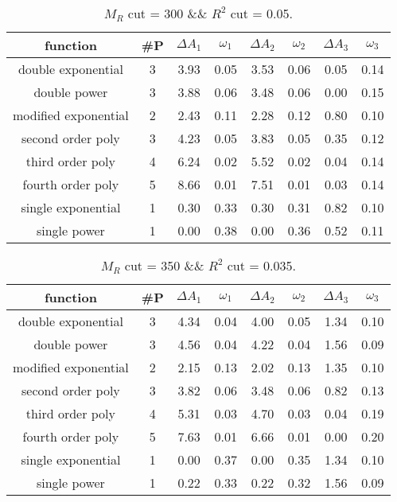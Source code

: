 
\begin{table}[H] 
\begin{center} 
\begin{tabular}{|c|c|cc|cc|cc|} 
\hline function & \#P & $\Delta A_1$ & $\omega_1$ & $\Delta A_2$ & $\omega_2$ & $\Delta A_3$ & $\omega_3$ \\ \hline 
double exponential &  3 &   3.93 &   0.05 &   3.53 &   0.06 &   0.05 &   0.14 \\ 
double power &  3 &   3.88 &   0.06 &   3.48 &   0.06 &   0.00 &   0.15 \\ 
modified exponential &  2 &   2.43 &   0.11 &   2.28 &   0.12 &   0.80 &   0.10 \\ 
second order poly &  3 &   4.23 &   0.05 &   3.83 &   0.05 &   0.35 &   0.12 \\ 
third order poly &  4 &   6.24 &   0.02 &   5.52 &   0.02 &   0.04 &   0.14 \\ 
fourth order poly &  5 &   8.66 &   0.01 &   7.51 &   0.01 &   0.03 &   0.14 \\ 
single exponential &  1 &   0.30 &   0.33 &   0.30 &   0.31 &   0.82 &   0.10 \\ 
single power &  1 &   0.00 &   0.38 &   0.00 &   0.36 &   0.52 &   0.11 \\ 
\hline 
\end{tabular} 
\caption{$M_R$ cut = 300 \&\& $R^2$ cut = 0.05.} 
\label{tab:FitChoices_300_0.05} 
\end{center} 
\end{table} 
 
 
\begin{table}[H] 
\begin{center} 
\begin{tabular}{|c|c|cc|cc|cc|} 
\hline function & \#P & $\Delta A_1$ & $\omega_1$ & $\Delta A_2$ & $\omega_2$ & $\Delta A_3$ & $\omega_3$ \\ \hline 
double exponential &  3 &   4.34 &   0.04 &   4.00 &   0.05 &   1.34 &   0.10 \\ 
double power &  3 &   4.56 &   0.04 &   4.22 &   0.04 &   1.56 &   0.09 \\ 
modified exponential &  2 &   2.15 &   0.13 &   2.02 &   0.13 &   1.35 &   0.10 \\ 
second order poly &  3 &   3.82 &   0.06 &   3.48 &   0.06 &   0.82 &   0.13 \\ 
third order poly &  4 &   5.31 &   0.03 &   4.70 &   0.03 &   0.04 &   0.19 \\ 
fourth order poly &  5 &   7.63 &   0.01 &   6.66 &   0.01 &   0.00 &   0.20 \\ 
single exponential &  1 &   0.00 &   0.37 &   0.00 &   0.35 &   1.34 &   0.10 \\ 
single power &  1 &   0.22 &   0.33 &   0.22 &   0.32 &   1.56 &   0.09 \\ 
\hline 
\end{tabular} 
\caption{$M_R$ cut = 350 \&\& $R^2$ cut = 0.035.} 
\label{tab:FitChoices_350_0.035} 
\end{center} 
\end{table} 
 
 
